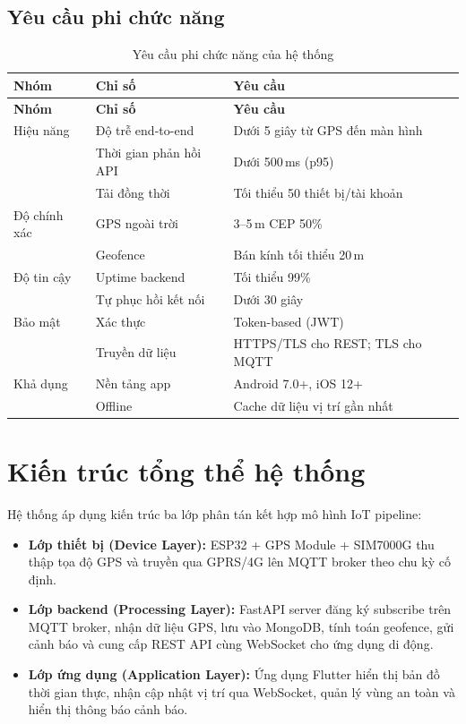 \documentclass[../DoAn.tex]{subfiles}
\begin{document}
\subsection{Yêu cầu phi chức năng}

\begin{longtable}{L{3cm}L{4cm}L{6.3cm}}
\caption{Yêu cầu phi chức năng của hệ thống}\\
\toprule
\textbf{Nhóm} & \textbf{Chỉ số} & \textbf{Yêu cầu}\\
\midrule
\endfirsthead
\toprule
\textbf{Nhóm} & \textbf{Chỉ số} & \textbf{Yêu cầu}\\
\midrule
\endhead
Hiệu năng & Độ trễ end-to-end & Dưới 5 giây từ GPS đến màn hình\\
& Thời gian phản hồi API & Dưới 500\,ms (p95)\\
& Tải đồng thời & Tối thiểu 50 thiết bị/tài khoản\\
\midrule
Độ chính xác & GPS ngoài trời & 3--5\,m CEP 50\%\\
& Geofence & Bán kính tối thiểu 20\,m\\
\midrule
Độ tin cậy & Uptime backend & Tối thiểu 99\%\\
& Tự phục hồi kết nối & Dưới 30 giây\\
\midrule
Bảo mật & Xác thực & Token-based (JWT)\\
& Truyền dữ liệu & HTTPS/TLS cho REST; TLS cho MQTT\\
\midrule
Khả dụng & Nền tảng app & Android 7.0+, iOS 12+\\
& Offline & Cache dữ liệu vị trí gần nhất\\
\bottomrule
\end{longtable}

\section{Kiến trúc tổng thể hệ thống}

Hệ thống áp dụng kiến trúc ba lớp phân tán kết hợp mô hình IoT pipeline:

\begin{itemize}
  \item \textbf{Lớp thiết bị (Device Layer):} ESP32 + GPS Module + SIM7000G thu thập tọa độ GPS và truyền qua GPRS/4G lên MQTT broker theo chu kỳ cố định.
  \item \textbf{Lớp backend (Processing Layer):} FastAPI server đăng ký subscribe trên MQTT broker, nhận dữ liệu GPS, lưu vào MongoDB, tính toán geofence, gửi cảnh báo và cung cấp REST API cùng WebSocket cho ứng dụng di động.
  \item \textbf{Lớp ứng dụng (Application Layer):} Ứng dụng Flutter hiển thị bản đồ thời gian thực, nhận cập nhật vị trí qua WebSocket, quản lý vùng an toàn và hiển thị thông báo cảnh báo.
\end{itemize}
\end{document}
